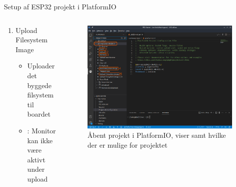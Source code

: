 \documentclass[aspectratio=169]{beamer}
\begin{document}
\begin{frame}{Setup af ESP32 projekt i PlatformIO}
\begin{columns}
\begin{column}{0.5\textwidth}
\begin{textBox}
\begin{itemize}
\begin{enumerate}
					\item Upload Filesystem Image
					\begin{itemize}
						\item Uploader det byggede filsystem til boardet
						\item {}: Monitor kan ikke være aktivt under upload
					\end{itemize}
				\end{enumerate}
			\end{itemize}
		\end{textBox}
	\end{column}
	\begin{column}{0.5\textwidth}
		\begin{figure}
  			\includegraphics[width=\textwidth,keepaspectratio=true]{assets/pictures/pio-project-3.png}
  			\caption{Åbent projekt i PlatformIO, viser  samt hvilke  der er mulige for projektet}
  			\label{fig:pio-project3}
		\end{figure}
	\end{column}
\end{columns}
\end{frame}
\end{document}
